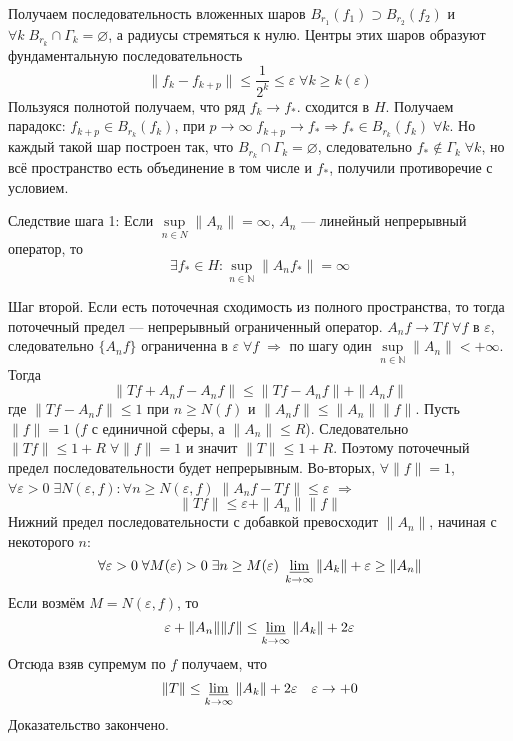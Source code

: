 \documentclass[14pt]{extarticle}
\begin{document}
\begin{Proof}
    Получаем последовательность вложенных шаров $B_{r_1}(f_1) \supset B_{r_2}(f_2)$ и $\forall k\; B_{r_k} \cap \Gamma_k = \varnothing$, а радиусы стремяться к нулю.
    Центры этих шаров образуют фундаментальную последовательность
    $$
    \|f_k - f_{k + p}\| \le \dfrac{1}{2^k} \le \varepsilon\; \forall k \ge k(\varepsilon)
    $$
    Пользуяся полнотой получаем, что ряд $f_k \to f_*$. сходится в $H$.
    Получаем парадокс: $f_{k+p} \in B_{r_k}(f_k)$, при $p \to \infty\; f_{k+p} \to f_* \Rightarrow  f_* \in B_{r_k}(f_k)\; \forall k$.
    Но каждый такой шар построен так, что $B_{r_k} \cap \Gamma_k = \varnothing$, следовательно $f_* \notin \Gamma_k\; \forall k$, но всё пространство есть объединение
    в том числе и $f_*$, получили противоречие с условием.

    Следствие шага 1: Если $\sup\limits_{n \in N}\|A_n\| = \infty$, $A_n$ --- линейный непрерывный оператор, то 
    $$\exists f_* \in H\colon
    \sup \limits_{n \in \mathbb N}\|A_n f_*\| = \infty
    $$

    Шаг второй. Если есть поточечная сходимость из полного пространства, то тогда поточечный предел --- непрерывный ограниченный оператор.
    $A_n f \to T f\; \forall f$ в $\varepsilon$, следовательно $\{A_n f\}$ ограниченна в $\varepsilon\; \forall f\; \Rightarrow$ по шагу один $\sup \limits_{n \in
    \mathbb N}\|A_n\| < +\infty$.
    Тогда 
    $$
    \|Tf + A_n f - A_n f\| \le \|Tf - A_n f\| + \|A_n f\|
    $$
     где $\|Tf - A_n f\| \le 1$ при $n \ge N(f)$ и $\|A_n f\| \le \|A_n\| \|f\|$. 
     Пусть $\|f\| = 1$ ($f$ с
    единичной сферы, а $\|A_n\| \le R$).
    Следовательно $\|Tf\| \le 1 + R\; \forall \|f\| = 1$ и значит $\|T\| \le 1 + R$.
    Поэтому поточечный предел последовательности будет непрерывным.
    Во-вторых, $\forall \|f\| = 1$, $\forall \varepsilon > 0\; \exists N(\varepsilon, f)\colon \forall n \ge N(\varepsilon, f)\; \|A_n f - Tf\| \le \varepsilon$
    $\Rightarrow$
    $$
    \|Tf\| \le \varepsilon + \|A_n\|\|f\|
    $$
    Нижний предел последовательности с добавкой превосходит $\|A_n\|$, начиная с некоторого $n$:
    $$
    \forall \varepsilon > 0\; \forall M(\varepsilon) > 0\; \exists n \ge M(\varepsilon)\; \varliminf\limits_{k \to \infty}\|A_k\| + \varepsilon \ge \|A_n\|
    $$
    Если возмём $M = N(\varepsilon, f)$, то 
    $$
    \varepsilon + \|A_n\| \|f\| \le \varliminf\limits_{k \to \infty}\|A_k\| + 2 \varepsilon
    $$
    Отсюда взяв супремум по $f$ получаем, что 
    $$
    \|T\| \le \varliminf\limits_{k \to \infty}\|A_k\| + 2 \varepsilon\quad \varepsilon \to +0
    $$
    Доказательство закончено.
\end{Proof}
\end{document}
